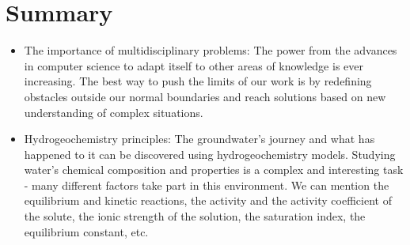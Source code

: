 \section{Summary}
\begin{itemize}
\item The importance of multidisciplinary problems: The power from the advances in computer science to adapt itself to other areas of knowledge is ever increasing. The best way to push the limits of our work is by redefining obstacles outside our normal boundaries and reach solutions based on new understanding of complex situations. 
\item Hydrogeochemistry principles: The groundwater's journey and what has happened to it can be discovered using hydrogeochemistry models. Studying water's chemical composition and properties is a complex and interesting task - many different factors take part in this environment. We can mention the equilibrium and kinetic reactions, the activity and the activity coefficient of the solute, the ionic strength of the solution, the saturation index, the equilibrium constant, etc. 
\end{itemize}